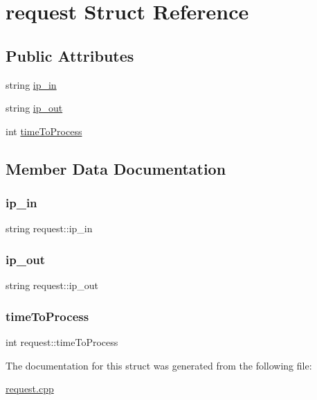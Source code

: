 \hypertarget{structrequest}{}\section{request Struct Reference}
\label{structrequest}
\subsection*{Public Attributes}
\begin{DoxyCompactItemize}
\item 
string \hyperlink{structrequest_a3428fbfdaf3f562a4a288c0feb44719e}{ip\+\_\+in}
\item 
string \hyperlink{structrequest_ad1649db5f6048ae933ab05ccf1553ed9}{ip\+\_\+out}
\item 
int \hyperlink{structrequest_aab0c9ef2df6d6c10f057a0066908cce2}{time\+To\+Process}
\end{DoxyCompactItemize}


\subsection{Member Data Documentation}
\mbox{\label{structrequest_a3428fbfdaf3f562a4a288c0feb44719e}} 
\subsubsection{\texorpdfstring{ip\+\_\+in}{ip\_in}}
{\footnotesize\ttfamily string request\+::ip\+\_\+in}

\mbox{\label{structrequest_ad1649db5f6048ae933ab05ccf1553ed9}} 
\subsubsection{\texorpdfstring{ip\+\_\+out}{ip\_out}}
{\footnotesize\ttfamily string request\+::ip\+\_\+out}

\mbox{\label{structrequest_aab0c9ef2df6d6c10f057a0066908cce2}} 
\subsubsection{\texorpdfstring{time\+To\+Process}{timeToProcess}}
{\footnotesize\ttfamily int request\+::time\+To\+Process}



The documentation for this struct was generated from the following file\+:\begin{DoxyCompactItemize}
\item 
\hyperlink{request_8cpp}{request.\+cpp}\end{DoxyCompactItemize}
